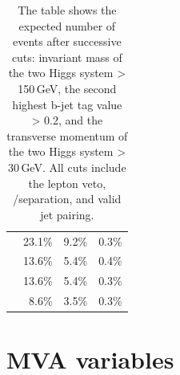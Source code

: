 \begin{table}[!htbp]
\begin{tabular}{lrrr}
\hline
\gammagamma{\Pphoton}{\BS}{\Pphoton}{\BS}{ \Pquark \Pquark \Pquark \Pquark}& 23.1\% & 9.2\%  & 0.3\%\\
\gammagamma{\Pphoton}{\BS}{\Pphoton}{\EPA}{ \Pquark \Pquark \Pquark \Pquark}& 13.6\% & 5.4\%  &0.4\%\\
\gammagamma{\Pphoton}{\EPA}{\Pphoton}{\BS}{ \Pquark \Pquark \Pquark \Pquark}& 13.6\% & 5.4\% & 0.3\%\\
\gammagamma{\Pphoton}{\EPA}{\Pphoton}{\EPA}{ \Pquark \Pquark \Pquark \Pquark}& 8.6\% & 3.5\% & 0.3\% \\
\hline \hline
\end{tabular}
\caption[List of signal and background samples after pre-selection cuts at .]
{The table shows the expected number of events after successive cuts:  invariant mass of the two Higgs system > 150\,GeV,  the  second highest b-jet tag value > 0.2, and the transverse momentum  of the two Higgs system  > 30\,GeV.  All cuts include the lepton veto, \eeToHHbbWW/\eeToHHbbbb separation, and valid jet pairing. \HiggsTableLow}
\label{tab:doubleHiggsPreslectionPart2}
\end{table}

\section{MVA variables}

